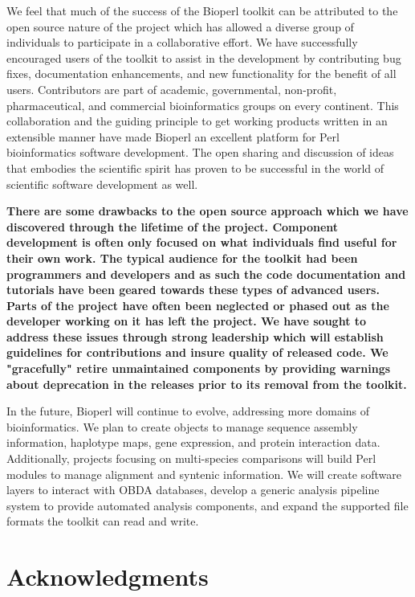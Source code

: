 \documentclass[12pt]{article}
\begin{document}
We feel that much of the success of the Bioperl toolkit can be
attributed to the open source nature of the project which has allowed
a diverse group of individuals to participate in a collaborative effort.
We have successfully encouraged users of the toolkit to assist in the
development by contributing bug fixes, documentation enhancements, and
new functionality for the benefit of all users.  Contributors are part
of academic, governmental, non-profit, pharmaceutical, and
commercial bioinformatics groups on every continent.  This collaboration and
the guiding principle to get working products written in an extensible
manner have made Bioperl an excellent platform for Perl bioinformatics
software development.  The open sharing and discussion of ideas that
embodies the scientific spirit has proven to be successful in the
world of scientific software development as well.  

\textbf{
There are some drawbacks to the open source approach which we have
discovered through the lifetime of the project.  Component development
is often only focused on what individuals find useful for their own
work.  The typical audience for the toolkit had been programmers and
developers and as such the code documentation and tutorials have been
geared towards these types of advanced users.  Parts of the project
have often been neglected or phased out as the developer working on it
has left the project.  We have sought to address these issues through
strong leadership which will establish guidelines for contributions
and insure quality of released code.  We "gracefully" retire
unmaintained components by providing warnings about deprecation in the
releases prior to its removal from the toolkit.
}

In the future, Bioperl will continue to evolve, addressing more domains
of bioinformatics.  We plan to create objects to manage sequence
assembly information, haplotype maps, gene expression, and protein
interaction data.  Additionally, projects focusing on multi-species
comparisons will build Perl modules to manage alignment and syntenic
information.  We will create software layers to interact with OBDA
databases, develop a generic analysis pipeline system to provide
automated analysis components, and expand the supported file formats
the toolkit can read and write.

\section{Acknowledgments}
\end{document}
